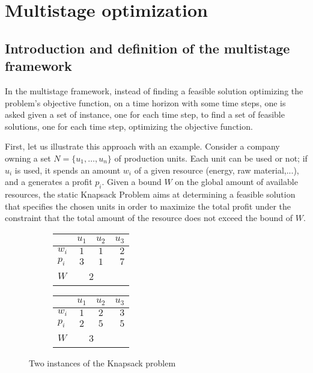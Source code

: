 \documentclass[a4paper]{book}
\begin{document}
\section{Multistage optimization}
\subsection{Introduction and definition of the multistage framework}
In the multistage framework, instead of finding a feasible solution optimizing the problem's objective function, on a time horizon with some time steps, one is asked given a set of instance, one for each time step, to find a set of feasible solutions, one for each time step, optimizing the objective function.

First, let us illustrate this approach with an example. Consider a company owning a set $N=\{u_1,\ldots,u_n\}$ of production units. Each unit can be used or not; if $u_i$ is used, it spends an amount $w_i$ of a given resource (energy, raw material,...), and a generates a profit $p_i$. Given a bound $W$ on the global amount of available resources, the static {\sc Knapsack Problem} aims at determining a feasible solution that specifies the chosen units in order to maximize the total profit under the constraint that the total amount of the resource does not exceed the bound of $W$.

\begin{figure}[h]
\centering
\begin{subfigure}[b]{0.4\textwidth}
\begin{tabular}{|l|c|c|r|}
  \hline
   &$u_1$&$u_2$&$u_3$ \\
  \hline
 $w_{i}$ & $1$ & $1$ & $2$\\
    \hline
  $p_{i} $& $3$ & $1$ & $7$\\
  \hline
  $W$ & \multicolumn{2}{c}{\text{   }2} &\\
  \hline
\end{tabular}
\end{subfigure}
\begin{subfigure}[b]{0.4\textwidth}
\begin{tabular}{|l|c|c|r|}
  \hline
   &$u_1$&$u_2$&$u_3$ \\
  \hline
 $w_{i}$ & $1$ & $2$ & $3$\\
    \hline
  $p_{i} $& $2$ & $5$ & $5$\\
  \hline
   $W$ & \multicolumn{2}{c}{\text{     }3} &\\
  \hline
\end{tabular}
\end{subfigure}
\caption{Two instances of the {\sc Knapsack} problem}
\label{statickp}
\end{figure}
\end{document}
